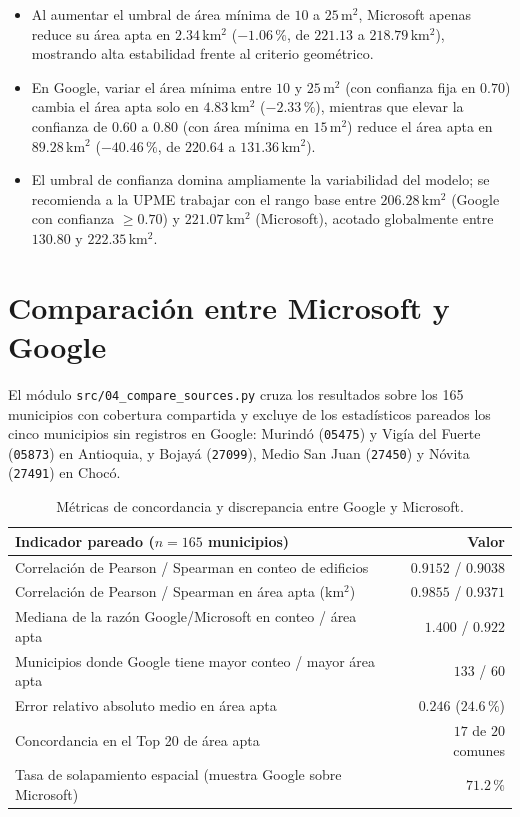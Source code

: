 \documentclass[12pt, letterpaper]{article}
\begin{document}
\begin{itemize}
  \item Al aumentar el umbral de área mínima de $10$ a $25$\,m$^2$, Microsoft apenas reduce su área apta en $2.34$\,km$^2$ ($-1.06\,\%$, de $221.13$ a $218.79$\,km$^2$), mostrando alta estabilidad frente al criterio geométrico.
  \item En Google, variar el área mínima entre $10$ y $25$\,m$^2$ (con confianza fija en $0.70$) cambia el área apta solo en $4.83$\,km$^2$ ($-2.33\,\%$), mientras que elevar la confianza de $0.60$ a $0.80$ (con área mínima en $15$\,m$^2$) reduce el área apta en $89.28$\,km$^2$ ($-40.46\,\%$, de $220.64$ a $131.36$\,km$^2$).
  \item El umbral de confianza domina ampliamente la variabilidad del modelo; se recomienda a la UPME trabajar con el rango base entre $206.28$\,km$^2$ (Google con confianza $\ge 0.70$) y $221.07$\,km$^2$ (Microsoft), acotado globalmente entre $130.80$ y $222.35$\,km$^2$.
\end{itemize}

\section{Comparación entre Microsoft y Google}\label{sec:comparacion}
El módulo \texttt{src/04\_compare\_sources.py} cruza los resultados sobre los 165 municipios con cobertura compartida y excluye de los estadísticos pareados los cinco municipios sin registros en Google: Murindó (\texttt{05475}) y Vigía del Fuerte (\texttt{05873}) en Antioquia, y Bojayá (\texttt{27099}), Medio San Juan (\texttt{27450}) y Nóvita (\texttt{27491}) en Chocó.

\begin{table}[H]
\centering
\small
{}
\begin{tabularx}{\textwidth}{X r}
\toprule
\textbf{Indicador pareado ($n = 165$ municipios)} & \textbf{Valor} \\
\midrule
Correlación de Pearson / Spearman en conteo de edificios & $0.9152$ / $0.9038$ \\
Correlación de Pearson / Spearman en área apta (km$^2$) & $0.9855$ / $0.9371$ \\
Mediana de la razón Google/Microsoft en conteo / área apta & $1.400$ / $0.922$ \\
Municipios donde Google tiene mayor conteo / mayor área apta & $133$ / $60$ \\
Error relativo absoluto medio en área apta & $0.246$ ($24.6\,\%$) \\
Concordancia en el Top 20 de área apta & $17$ de $20$ comunes \\
Tasa de solapamiento espacial (muestra Google sobre Microsoft) & $71.2\,\%$ \\
\bottomrule
\end{tabularx}
\caption{Métricas de concordancia y discrepancia entre Google y Microsoft.}
\label{tab:metricas_comp}
\end{table}
\end{document}
